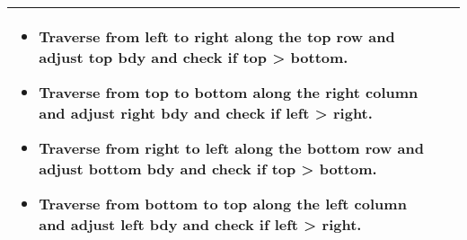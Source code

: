 \begin{summary}
\begin{center}
\begin{tabular}{ll}
{\begin{itemize}
\begin{itemize}
                        \item Traverse from left to right along the top row and adjust top bdy and check if top > bottom.
                        \item Traverse from top to bottom along the right column and adjust right bdy and check if left > right.
                        \item Traverse from right to left along the bottom row and adjust bottom bdy and check if top > bottom.
                        \item Traverse from bottom to top along the left column and adjust left bdy and check if left > right.
                    \end{itemize}
                \end{itemize}
            } \\
            \bottomrule
        \end{tabular}
    \end{center}
\end{summary}

